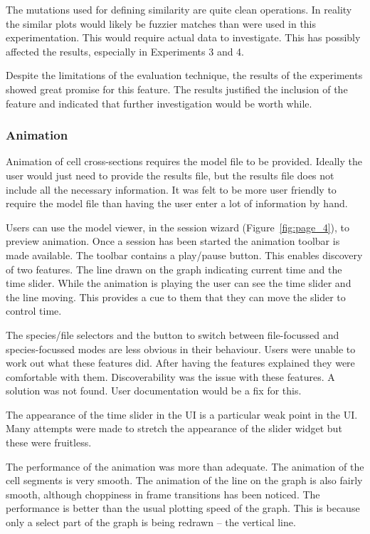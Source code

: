 The mutations used for defining similarity are quite clean operations.  In reality the similar plots would likely be fuzzier matches than were used in this experimentation.  This would require actual data to investigate.  This has possibly affected the results, especially in Experiments 3 and 4.

Despite the limitations of the evaluation technique, the results of the experiments showed great promise for this feature.  The results justified the inclusion of the feature and indicated that further investigation would be worth while.

\subsubsection{Animation}

Animation of cell cross-sections requires the model file to be provided.  Ideally the user would just need to provide the results file, but the results file does not include all the necessary information.  It was felt to be more user friendly to require the model file than having the user enter a lot of information by hand.

Users can use the model viewer, in the session wizard (Figure~\ref{fig:page_4}), to preview animation.  Once a session has been started the animation toolbar is made available.  The toolbar contains a play/pause button.  This enables discovery of two features.  The line drawn on the graph indicating current time and the time slider.  While the animation is playing the user can see the time slider and the line moving.  This provides a cue to them that they can move the slider to control time.

The species/file selectors and the button to switch between file-focussed and species-focussed modes are less obvious in their behaviour.  Users were unable to work out what these features did.  After having the features explained they were comfortable with them.  Discoverability was the issue with these features.  A solution was not found. User documentation would be a fix for this.

The appearance of the time slider in the \ac{UI} is a particular weak point in the \ac{UI}.  Many attempts were made to stretch the appearance of the slider widget but these were fruitless.

The performance of the animation was more than adequate.  The animation of the cell segments is very smooth.  The animation of the line on the graph is also fairly smooth, although choppiness in frame transitions has been noticed.  The performance is better than the usual plotting speed of the graph. This is because only a select part of the graph is being redrawn -- the vertical line.

